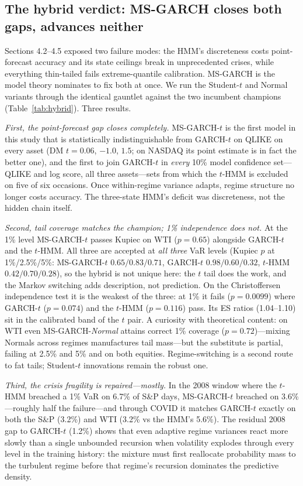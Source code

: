 \documentclass[11pt]{article}
\begin{document}
\subsection{The hybrid verdict: MS-GARCH closes both gaps, advances neither}
\label{sec:hybrid}
Sections 4.2--4.5 exposed two failure modes: the HMM's discreteness costs
point-forecast accuracy and its state ceilings break in unprecedented
crises, while everything thin-tailed fails extreme-quantile calibration.
MS-GARCH is the model theory nominates to fix both at once. We run the
Student-$t$ and Normal variants through the identical gauntlet against the
two incumbent champions (Table~\ref{tab:hybrid}). Three results.

\emph{First, the point-forecast gap closes completely.} MS-GARCH-$t$ is
the first model in this study that is statistically indistinguishable from
GARCH-$t$ on QLIKE on every asset (DM $t = 0.06$, $-1.0$, $1.5$; on NASDAQ
its point estimate is in fact the better one), and the first to join
GARCH-$t$ in \emph{every} 10\% model confidence set---QLIKE and log
score, all three assets---sets from which the $t$-HMM is excluded on five
of six occasions. Once within-regime variance adapts, regime structure no
longer costs accuracy. The three-state HMM's deficit was discreteness, not
the hidden chain itself.

\emph{Second, tail coverage matches the champion; 1\% independence does
not.} At the 1\% level MS-GARCH-$t$ passes Kupiec on WTI ($p=0.65$)
alongside GARCH-$t$ and the $t$-HMM. All three are accepted at
\emph{all three} VaR levels (Kupiec $p$ at 1\%/2.5\%/5\%: MS-GARCH-$t$
$0.65/0.83/0.71$, GARCH-$t$ $0.98/0.60/0.32$, $t$-HMM $0.42/0.70/0.28$),
so the hybrid is not unique here: the $t$ tail does the work, and the
Markov switching adds description, not prediction. On the Christoffersen
independence test it is the weakest of the three: at 1\% it fails
($p=0.0099$) where GARCH-$t$ ($p=0.074$) and the $t$-HMM ($p=0.116$) pass.
Its ES ratios (1.04--1.10) sit in the calibrated band of the $t$ pair. A curiosity with theoretical content: on WTI even
MS-GARCH-\emph{Normal} attains correct 1\% coverage ($p=0.72$)---mixing
Normals across regimes manufactures tail mass---but the substitute is
partial, failing at 2.5\% and 5\% and on both equities. Regime-switching
is a second route to fat tails; Student-$t$ innovations remain the robust
one.

\emph{Third, the crisis fragility is repaired---mostly.} In the 2008
window where the $t$-HMM breached a 1\% VaR on 6.7\% of S\&P days,
MS-GARCH-$t$ breached on 3.6\%---roughly half the failure---and through
COVID it matches GARCH-$t$ exactly on both the S\&P (3.2\%) and WTI
(3.2\% vs the HMM's 5.6\%). The residual 2008 gap to GARCH-$t$ (1.2\%)
shows that even adaptive regime variances react more slowly than a single
unbounded recursion when volatility explodes through every level in the
training history: the mixture must first reallocate probability mass to
the turbulent regime before that regime's recursion dominates the
predictive density.
\end{document}

